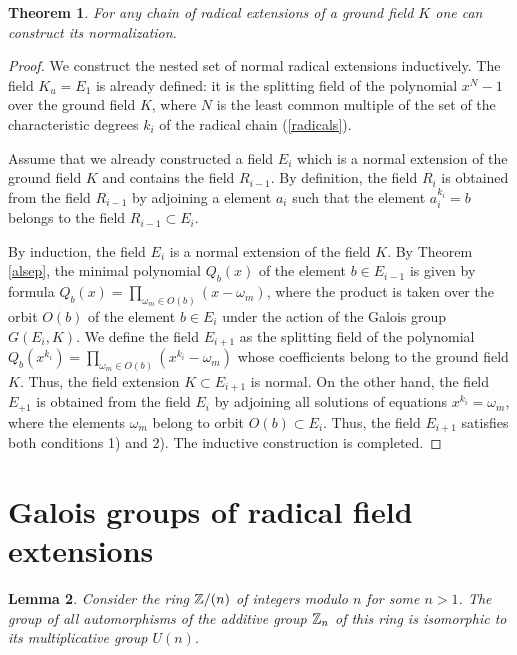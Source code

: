 \documentclass[11pt]{article}
\theoremstyle{plain}
\newtheorem{theorem}{Theorem}[section]
\newtheorem{lemma}[theorem]{Lemma}
\theoremstyle{definition}
\begin{document}
\begin{theorem}\label{exorm} For any chain of radical extensions of a ground field $K$ one can construct its normalization.
\end{theorem}

\begin{proof}
We construct the nested set of normal radical extensions inductively. The field $K_u=E_1$ is already defined: it is the splitting field of the polynomial $x^N-1$ over the ground field $K$, where $N$  is the least common multiple of the set of the characteristic degrees $k_i$ of the radical chain (\ref{radicals}).

Assume that we already constructed a field $E_{i}$ which is a normal extension of the ground field $K$ and contains the field $R_{i-1}$. By definition, the field $R_i$ is obtained from the field $R_{i-1}$ by adjoining a element $a_i$ such that the element $a^{k_i}_i=b$ belongs to the field $R_{i-1}\subset E_i$.

By induction, the field $E_i$ is a normal extension of the field $K$. By Theorem \ref{alsep}, the minimal polynomial $Q_b(x)$ of the element $b\in E_{i-1}$ is given by  formula $Q_b(x)= \prod_{\omega_m\in O(b)}(x-\omega_m)$, where the product is taken over the orbit $O(b)$ of the element $b\in E_i$ under the action of the Galois group $G(E_i,K)$. We define the field $E_{i+1}$ as the splitting field of the polynomial $Q_b(x^{k_i})= \prod_{\omega_m\in O(b)}(x^{k_i}-\omega_m)$ whose coefficients belong to the ground field $K$. Thus, the field extension $K\subset E_{i+1}$ is normal. On the other hand, the field $E_{+1}$ is obtained from the field $E_i$ by adjoining all solutions  of equations $x^{k_i}=\omega_m$, where the elements $\omega_m$ belong to orbit $O(b)\subset E_i$. Thus, the field $E_{i+1}$ satisfies both conditions 1) and 2). The inductive construction is completed.
\end{proof}

\section{Galois groups of radical field extensions}

\begin{lemma}\label{addmul} Consider the ring $\Bbb Z/ (n)$ of integers modulo $n$ for some  $n>1$. The group of all automorphisms of the additive group $\Bbb Z_n$ of this ring   is isomorphic to its multiplicative group $U(n)$.
\end{lemma}
\end{document}

